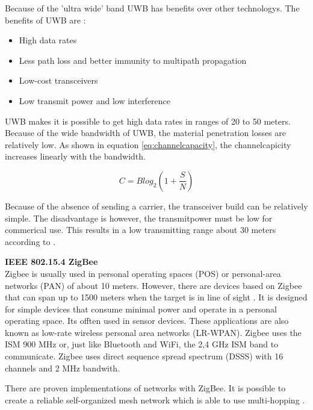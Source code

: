 \documentclass[10pt,a4paper]{article}
\begin{document}
Because of the 'ultra wide' band UWB has benefits over other technologys. The benefits of UWB are \cite{ultrawidebandwirelesscommunications}\cite{combook}: 
\begin{itemize}
\setlength\itemsep{0em}
    \item High data rates
    \item Less path loss and better immunity to multipath propagation
    \item Low-cost transceivers
    \item Low transmit power and low interference
\end{itemize}
 UWB makes it is possible to get high data rates in ranges of 20 to 50 meters. Because of the wide bandwidth of UWB, the material penetration losses are relatively low. As shown in equation \ref{eq:channelcapacity}, the channelcapicity increases linearly with the bandwidth.

 \begin{equation}
    C=Blog_2(1+\frac{S}{N})
    \label{eq:channelcapacity}
 \end{equation}

 Because of the absence of sending a carrier, the transceiver build can be relatively simple. \cite{ultrawidebandwirelesscommunications} The disadvantage is however, the transmitpower must be low for commerical use. This results in a low transmitting range about 30 meters according to \cite{combook}.



\textbf{\large IEEE 802.15.4 ZigBee}\\
Zigbee is usually used in personal operating spaces (POS) or personal-area networks (PAN) of about 10 meters. \cite{combook} However, there are devices based on Zigbee that can span up to 1500 meters when the target is in line of sight \cite{zigbeewiki}. It is designed for simple devices that consume minimal power and operate in a personal operating space. Its offten used in sensor devices. These applications are also known as low-rate wireless personal area networks (LR-WPAN). \cite{comparitivestudywirelessprotocols} Zigbee uses the ISM 900 MHz or, just like Bluetooth and WiFi, the 2,4 GHz ISM band to communicate. Zigbee uses direct sequence spread spectrum (DSSS) with 16 channels and 2 MHz bandwith.

There are proven implementations of networks with ZigBee. It is possible to create a reliable self-organized mesh network which is able to use multi-hopping \cite{comparitivestudywirelessprotocols}.
\end{document}
